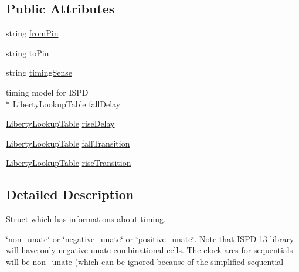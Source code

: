 \subsection*{Public Attributes}
\begin{DoxyCompactItemize}
\item 
string \hyperlink{structLibertyTimingInfo_a6cb3b02b8c016a6a0f633ade7a8ee499}{from\-Pin}
\item 
string \hyperlink{structLibertyTimingInfo_a2bc2b4f64c8a8b71e314b97a37f14db4}{to\-Pin}
\item 
string \hyperlink{structLibertyTimingInfo_a54b164af0fb48cdbceb754858cbeface}{timing\-Sense}
\item 
timing model for I\-S\-P\-D \\*
\hyperlink{structLibertyLookupTable}{Liberty\-Lookup\-Table} \hyperlink{structLibertyTimingInfo_a4fdd676db9841962ef570a064ff97c81}{fall\-Delay}
\item 
\hyperlink{structLibertyLookupTable}{Liberty\-Lookup\-Table} \hyperlink{structLibertyTimingInfo_af2baf3e8053ed178d0d3dc8159ab8248}{rise\-Delay}
\item 
\hyperlink{structLibertyLookupTable}{Liberty\-Lookup\-Table} \hyperlink{structLibertyTimingInfo_a5af7b44ccbb69224084557182d2e3acb}{fall\-Transition}
\item 
\hyperlink{structLibertyLookupTable}{Liberty\-Lookup\-Table} \hyperlink{structLibertyTimingInfo_a1b31e1e18c0cc373e1eeaa1e999fbedd}{rise\-Transition}
\end{DoxyCompactItemize}


\subsection{Detailed Description}
Struct which has informations about timing. 

\char`\"{}non\-\_\-unate\char`\"{} or \char`\"{}negative\-\_\-unate\char`\"{} or \char`\"{}positive\-\_\-unate\char`\"{}. Note that I\-S\-P\-D-\/13 library will have only negative-\/unate combinational cells. The clock arcs for sequentials will be non\-\_\-unate (which can be ignored because of the simplified sequential 

